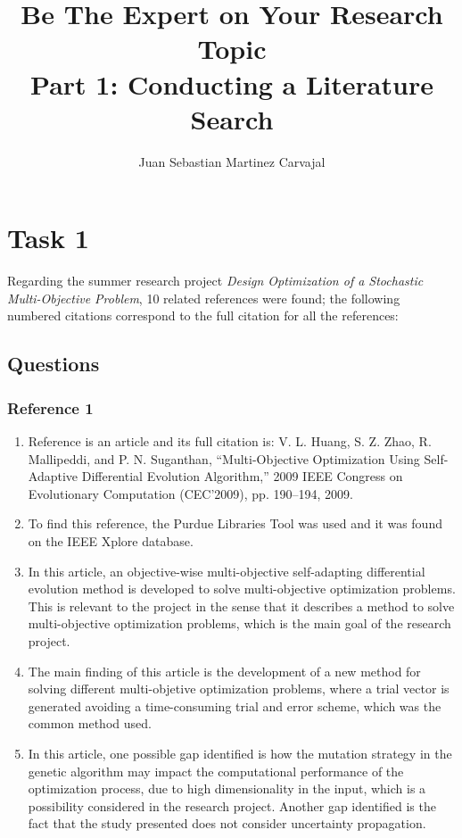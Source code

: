 \documentclass{journal}
\title{\textbf{Be The Expert on Your Research Topic}\\Part 1: Conducting a Literature Search}
\author{Juan Sebastian Martinez Carvajal}
\date{}
\begin{document}
\maketitle
\hrulefill

\section{Task 1}
Regarding the summer research project \textit{Design Optimization of a Stochastic Multi-Objective Problem}, 10 related references were found; the following numbered citations correspond to the full citation for all the references:\\




\subsection{Questions}

\subsubsection{Reference 1}
\begin{enumerate}
	\item Reference \cite{Huang2009} is an article and its full citation is: V. L. Huang, S. Z. Zhao, R. Mallipeddi, and P. N. Suganthan, “Multi-Objective Optimization Using Self-Adaptive Differential Evolution Algorithm,” 2009 IEEE Congress on Evolutionary Computation (CEC’2009), pp. 190–194, 2009.
	\item To find this reference, the Purdue Libraries Tool was used and it was found on the IEEE Xplore database.
	\item In this article, an objective-wise multi-objective self-adapting differential evolution method is developed to solve multi-objective optimization problems. This is relevant to the project in the sense that it describes a method to solve multi-objective optimization problems, which is the main goal of the research project.
	\item The main finding of this article is the development of a new method for solving different multi-objetive optimization problems, where a trial vector is generated avoiding a time-consuming trial and error scheme, which was the common method used.
	\item In this article, one possible gap identified is how the mutation strategy in the genetic algorithm may impact the computational performance of the optimization process, due to high dimensionality in the input, which is a possibility considered in the research project. Another gap identified is the fact that the study presented does not consider uncertainty propagation.
\end{enumerate}
\end{document}
